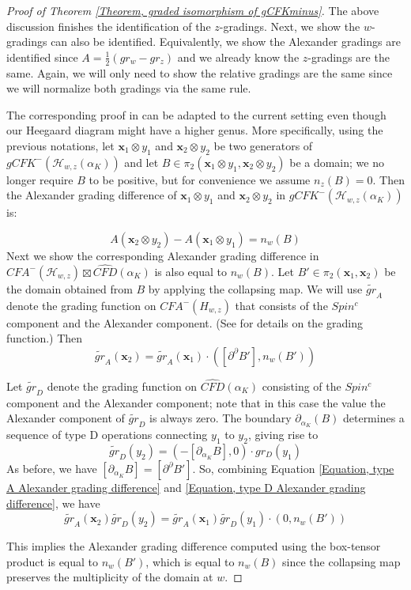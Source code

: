 \documentclass{amsart}
\theoremstyle{definition}
\theoremstyle{remark}
\numberwithin{equation}{section}
\numberwithin{equation}{section} \makeatletter
\begin{document}
\begin{proof}[Proof of Theorem \ref{Theorem, graded isomorphism of gCFKminus}]
The above discussion finishes the identification of the $z$-gradings. Next, we show the $w$-gradings can also be identified. Equivalently, we show the Alexander gradings are identified since $A=\frac{1}{2}(gr_w-gr_z)$ and we already know the $z$-gradings are the same. Again, we will only need to show the relative gradings are the same since we will normalize both gradings via the same rule.

The corresponding proof in \cite{Chen2019} can be adapted to the current setting even though our Heegaard diagram might have a higher genus. More specifically, using the previous notations, let $\bm{x}_1\otimes y_1$ and $\bm{x}_2\otimes y_2$ be two generators of $gCFK^-(\mathcal{H}_{w,z}(\alpha_{K}))$ and let $B\in {\pi}_2(\bm{x}_1\otimes y_1,\bm{x}_2\otimes y_2)$ be a domain; we no longer require $B$ to be positive, but for convenience we assume $n_z(B)=0$. Then the Alexander grading difference of $\bm{x}_1\otimes y_1$ and $\bm{x}_2\otimes y_2$ in $gCFK^-(\mathcal{H}_{w,z}(\alpha_{K}))$ is:

$$A(\bm{x}_2\otimes y_2)-A(\bm{x}_1\otimes y_1)=n_w(B)$$ 
Next we show the corresponding Alexander grading difference in ${CFA}^-(\mathcal{H}_{w,z})\boxtimes \widehat{CFD}(\alpha_K)$ is also equal to $n_w(B)$.
Let $B'\in \pi_2(\bm{x}_1,\bm{x}_2)$ be the domain obtained from $B$ by applying the collapsing map. We will use $\tilde{gr}_A$ denote the grading function on $CFA^-(H_{w,z})$ that consists of the $Spin^c$ component and the Alexander component. (See \cite[Section 11.4]{LOT18} for details on the grading function.) Then 
\begin{equation}\label{Equation, type A Alexander grading difference}
\tilde{gr}_A(\bm{x}_2)=\tilde{gr}_A({\bm{x}}_1)\cdot([\partial^\partial B'], n_w(B'))
\end{equation}
  
Let $\tilde{gr}_D$ denote the grading function on $\widehat{CFD}(\alpha_{K})$ consisting of the $Spin^c$ component and the Alexander component; note that in this case the value the Alexander component of $\tilde{gr}_D$ is always zero. 
The boundary $\partial_{\alpha_K}(B)$ determines a sequence of type D operations connecting $y_1$ to $y_2$, giving rise to 
\begin{equation}\label{Equation, type D Alexander grading difference}
\tilde{gr}_D(y_2)=(-[\partial_{\alpha_{K}}B],0)\cdot gr_D(y_1)
\end{equation}
As before, we have $[\partial_{\alpha_{K}}B]=[\partial^\partial B']$. So, combining Equation \ref{Equation, type A Alexander grading difference} and \ref{Equation, type D Alexander grading difference}, we have 
$$\tilde{gr}_A(\bm{x}_2)\tilde{gr}_D(y_2)=\tilde{gr}_A(\bm{x}_1)\tilde{gr}_D(y_1)\cdot(0,n_w(B'))$$

This implies the Alexander grading difference computed using the box-tensor product is equal to $n_w(B')$, which is equal to $n_w(B)$ since the collapsing map preserves the multiplicity of the domain at $w$.
\end{proof}
\end{document}
